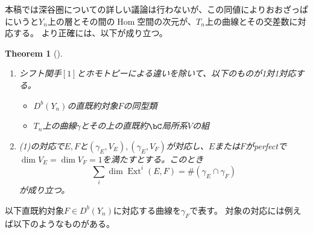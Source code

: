 \documentclass[uplatex,a4paper,dvipdfmx]{jsarticle}
\theoremstyle{plain}
\newtheorem{theorem}{Theorem}[section]
\theoremstyle{definition}
\DeclareMathOperator{\Hom}{\mathrm{Hom}}
\DeclareMathOperator{\Ext}{\mathrm{Ext}}
\begin{document}
本稿では深谷圏についての詳しい議論は行わないが、この同値によりおおざっぱにいうと$Y_n$上の層とその間の$\Hom$空間の次元が、$T_n$上の曲線とその交差数に対応する。
より正確には、以下が成り立つ。
\begin{theorem}[\cite{2020arXiv201108288O}]
	\begin{enumerate}
		\item シフト関手$[1]$とホモトピーによる違いを除いて、以下のものが1対1対応する。\begin{itemize}
			      \item $D^b(Y_n)$の直既約対象$F$の同型類
			      \item $T_n$上の曲線$\gamma$とその上の直既約$\bC$局所系$V$の組
		      \end{itemize}
		\item (1)の対応で$E,F$と$(\gamma_E, V_E), (\gamma_E, V_F)$が対応し、$E$または$F$がperfectで$\dim V_E = \dim V_F = 1$を満たすとする。このとき\begin{equation}
			      \sum_{i}\dim\Ext^i(E, F) = \#(\gamma_E \cap \gamma_F)
		      \end{equation}が成り立つ。
	\end{enumerate}
\end{theorem}
以下直既約対象$F \in D^b(Y_n)$に対応する曲線を$\gamma_F$で表す。
対象の対応には例えば以下のようなものがある。
\end{document}
